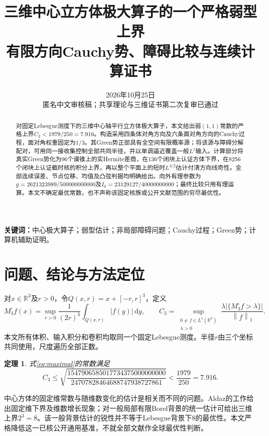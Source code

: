 \documentclass[UTF8,11pt,a4paper,fontset=fandol]{ctexart}
\title{三维中心立方体极大算子的一个严格弱型上界\\\large 有限方向Cauchy势、障碍比较与连续计算证书}
\author{}
\date{2026年10月25日\\\small 匿名中文审核稿；共享理论与三维证书第二次复审已通过}
\newtheorem{theorem}{定理}[section]
\theoremstyle{definition}\newtheorem{definition}[theorem]{定义}
\theoremstyle{remark}\newtheorem{remark}[theorem]{注}
\newcommand{\R}{\mathbb R}
\newcommand{\dd}{\,\mathrm d}
\newcommand{\norm}[1]{\left\lVert#1\right\rVert}
\newcommand{\abs}[1]{\left|#1\right|}
\begin{document}
\maketitle
\begin{abstract}
对固定Lebesgue测度下的三维中心轴平行立方体极大算子，本文给出弱$(1,1)$常数的严格上界$C_3<1979/250=7.916$。构造采用四条体对角方向及六条面对角方向的Cauchy过程，面对角权重固定为$1/3$。其Green势正部具有全空间有限概率源；将该源与障碍分解配对，可用同一接收集控制全部共同半径，并以单调逼近覆盖一般$L^1$输入。计算部分将真实Green势化为96个谱锥上的实Hermite差商，在136个闭块上认证方体下界，在8256个闭块上认证截时核的积分上界，再以整个平面上的短时$L^{3/2}$估计付清方向线奇性。全部连续误差、节点位移、均值及凸弦判据均明确给出。向外有理参数为$g=2621323989/500000000000$及$I_0=23129127/40000000000$；最终比较只用有理运算。本文不确定最优常数，也不声称该固定核族或公开文献范围的穷尽最优性。
\end{abstract}
\noindent\textbf{关键词：}中心极大算子；弱型估计；非局部障碍问题；Cauchy过程；Green势；计算机辅助证明。

\section{问题、结论与方法定位}
对$x\in\R^3$及$r>0$，令$Q(x,r)=x+[-r,r]^3$，定义
\begin{equation}\label{eq:maximal}
 M^\square_3 f(x)=\sup_{r>0}\frac1{(2r)^3}\int_{Q(x,r)}\abs{f(y)}\dd y,
 \qquad
 C_3=\sup_{\substack{0\ne f\in L^1(\R^3)\\\lambda>0}}
 \frac{\lambda\abs{\{M^\square_3 f>\lambda\}}}{\norm f_1}.
\end{equation}
本文所有体积、输入积分和卷积均取同一个固定Lebesgue测度。半径$r$由三个坐标共同使用，尺度遍历全部正数。

\begin{theorem}\label{thm:main}
式\eqref{eq:maximal}的常数满足
\begin{equation}\label{eq:bound}
 C_3\le \sqrt{\frac{1547906585017734375000000000}
 {24707828464688747938727861}}<\frac{1979}{250}=7.916.
\end{equation}
\end{theorem}

中心方体的固定维常数与随维数变化的估计是相关而不同的问题。Aldaz的工作给出固定维下界及维数增长现象\cite{Aldaz2000,Aldaz2011}；对一般局部有限Borel背景的统一估计可给出三维上界$2^3=8$\cite{AldazKissing2020}。该一般背景估计的锐性并不等于Lebesgue背景下$8$的最优性。本文严格降低这一已核公开通用基准，不就全部文献作全球最优性判断。
\end{document}
